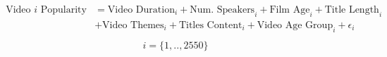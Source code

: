 \begin{align}
\begin{split}
\text{Video $i$ Popularity}&=\text{Video Duration}_i+\text{Num. Speakers}_i+\text{Film Age}_i+\text{Title Length}_i\\
&+\text{Video Themes}_i+\text{Titles Content}_i +\text{Video Age Group}_i+\epsilon_i\\
\end{split}
\label{simple_linear_eqn}
\end{align}
\begin{equation*}
i=\{1,..,2550\}
\end{equation*}